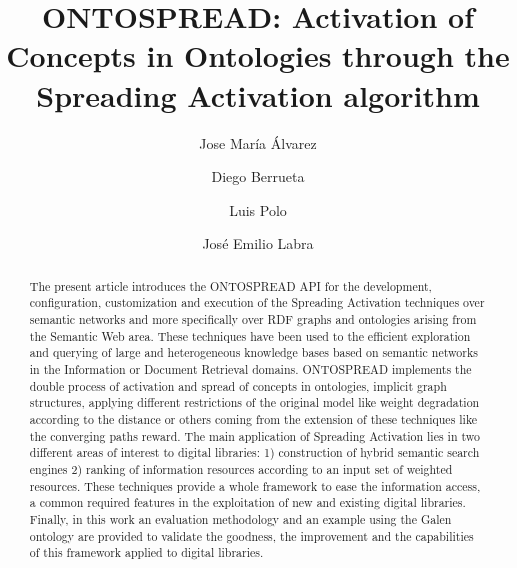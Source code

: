 \documentclass{llncs}
\begin{document}
\title{ONTOSPREAD: Activation of Concepts in Ontologies through the Spreading
Activation algorithm}


\author{Jose Mar\'{i}a \'{A}lvarez \and Diego Berrueta \and Luis Polo
 \and Jos\'{e} Emilio Labra} 







\maketitle

\begin{abstract}
The present article introduces the ONTOSPREAD API for the development,
configuration, customization and execution of the Spreading Activation
techniques over semantic networks and more specifically over RDF graphs and ontologies 
arising from the Semantic Web area. These techniques have been used to
the efficient exploration and querying of large and heterogeneous knowledge bases 
based on semantic networks in the Information or Document Retrieval domains. 
ONTOSPREAD implements the double process of activation and spread of concepts in ontologies, implicit
graph structures, applying different restrictions of the original model like weight degradation 
according to the distance or others coming from the extension of these techniques like
the converging paths reward. The main application of Spreading Activation
lies in two different areas of interest to digital libraries: 1) construction of hybrid semantic search engines 2) ranking of
information resources according to an input set of weighted resources. These techniques provide a whole framework to ease
the information access, a common required features in the exploitation
of new and existing digital libraries. Finally, in this work an evaluation methodology and 
an example using the Galen ontology are provided to validate the goodness, the improvement and the capabilities of 
this framework applied to digital libraries.
\end{abstract}
\end{document}
